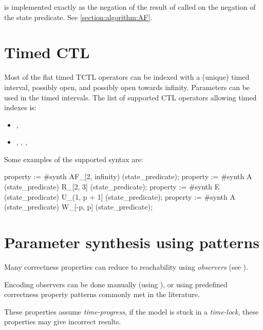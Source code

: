  is implemented exactly as the negation of the result of  called on the negation of the state predicate.
See \cref{section:algorithm:AF}.


\section{Timed CTL}\label{section:algorithm:timedCTL}

Most of the flat timed TCTL operators can be indexed with a (unique) timed interval, possibly open, and possibly open towards infinity.
Parameters can be used in the timed intervals.
The list of supported CTL operators allowing timed indexes is:
\begin{itemize}
	\item {}, 
	\item {}, , , 
\end{itemize}

Some examples of the supported syntax are:

\begin{IMITATORproperty}
property := #synth AF_[2, infinity) (state_predicate);
property := #synth A (state_predicate) R_[2, 3] (state_predicate);
property := #synth E (state_predicate) U_(1, p + 1] (state_predicate);
property := #synth A (state_predicate) W_[-p, p] (state_predicate);
\end{IMITATORproperty}



\section{Parameter synthesis using patterns}\label{section:algorithm:patterns}

Many correctness properties can reduce to reachability using \emph{observers} (see \cite{ABL98,ABBL98,ABBL03,Andre13ICECCS}).

Encoding observers can be done manually (using \adhoc{} \IPTA{}), or using predefined correctness property patterns commonly met in the literature.

\begin{becareful}
	These properties assume \emph{time-progress}, \ie{} if the model is stuck in a \emph{time-lock}, these properties may give incorrect results.
\end{becareful}

